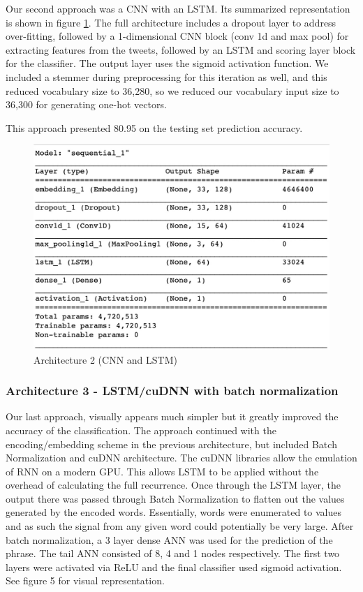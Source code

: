 \documentclass[conference]{sig-alternate-05-2015}
\begin{document}
Our second approach was a CNN with an LSTM. Its summarized representation is shown in figure \ref{fig:model CNN LSTM}. The full architecture includes a dropout layer to address over-fitting, followed by a 1-dimensional CNN block (conv 1d and max pool) for extracting features from the tweets, followed by an LSTM and scoring layer block for the classifier. The output layer uses the sigmoid activation function. We included a stemmer during preprocessing for this iteration as well, and this reduced vocabulary size to 36,280, so we reduced our vocabulary input size to 36,300 for generating one-hot vectors.

This approach presented 80.95 on the testing set prediction accuracy.

\begin{figure}
	\centering
	\includegraphics[width=0.8\linewidth]{"Model_CNN_LSTM"}
	\caption{Architecture 2 (CNN and LSTM)}
	\label{fig:model CNN LSTM}
\end{figure}

\subsubsection{Architecture 3 - LSTM/cuDNN with batch normalization}

Our last approach, visually appears much simpler but it greatly improved the accuracy of the classification.  The approach continued with the encoding/embedding scheme in the previous architecture, but included Batch Normalization and cuDNN architecture.  The cuDNN libraries allow the emulation of RNN on a modern GPU.  This allows LSTM to be applied without the overhead of calculating the full recurrence.  Once through the LSTM layer, the output there was passed through Batch Normalization to flatten out the values generated by the encoded words.  Essentially, words were enumerated to values and as such the signal from any given word could potentially be very large.  After batch normalization, a 3 layer dense ANN was used for the prediction of the phrase.  The tail ANN consisted of 8, 4 and 1 nodes respectively.  The first two layers were activated via ReLU and the final classifier used sigmoid activation.  See figure 5 for visual representation.
\end{document}
